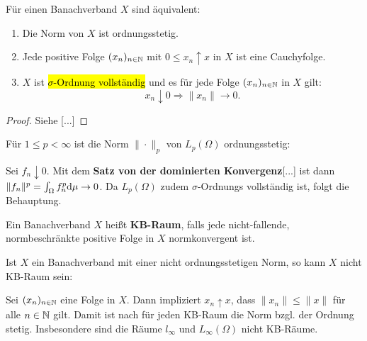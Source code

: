 \begin{prop}
Für einen Banachverband $X$ sind äquivalent:
\begin{enumerate}
\item Die Norm von $X$ ist ordnungsstetig.
\item Jede positive Folge $(x_n)_{n\in\mathbb{N}}$ mit $0\leq x_n\uparrow x$ in $X$ ist eine Cauchyfolge.
\item $X$ ist \hl{$\sigma$-Ordnung vollständig} und es für jede Folge $(x_n)_{n\in\mathbb{N}}$ in $X$ gilt:
\begin{equation*}
x_n\downarrow 0\Rightarrow \|x_n\|\to 0.
\end{equation*}
\end{enumerate}
\end{prop}

\begin{proof}
Siehe \cite{} [...]
\end{proof}

\begin{bsp}
Für $1\leq p< \infty$ ist die Norm $\|\cdot\|_p$ von  $L_p(\Omega)$ ordnungsstetig:

\par
Sei $f_n\downarrow 0$. Mit dem \textbf{Satz von der dominierten Konvergenz}[...] ist dann $\|f_n\|^p=\int_\Omega f_n^p\text d\mu\to 0$. Da $L_p(\Omega)$ zudem $\sigma$-Ordnungs vollständig ist, folgt die Behauptung.
\end{bsp}

\begin{defi}
Ein Banachverband $X$ heißt \textbf{KB-Raum}, falls jede nicht-fallende, normbeschränkte positive Folge in $X$ normkonvergent ist.
\end{defi}

\begin{bsp}
Ist $X$ ein Banachverband mit einer nicht ordnungsstetigen Norm, so kann $X$ nicht KB-Raum sein: 

\par
Sei $(x_n)_{n\in\mathbb{N}}$ eine Folge in $X$. Dann impliziert $x_n\uparrow x$, dass $\|x_n\|\leq \|x\|$ für alle $n\in\mathbb{N}$ gilt. Damit ist nach \Cref{} für jeden KB-Raum die Norm bzgl. der Ordnung stetig. Insbesondere sind die Räume $l_\infty$ und $L_\infty(\Omega)$ nicht KB-Räume.
\end{bsp}

